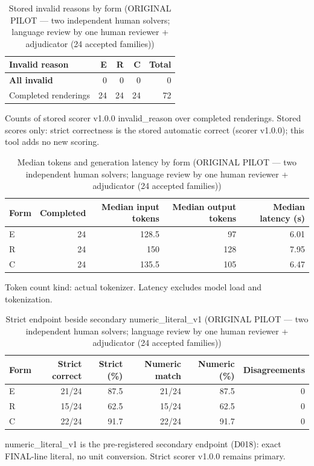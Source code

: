 \begin{table}[t]
\centering
\small
\caption{Stored invalid reasons by form (ORIGINAL PILOT --- two independent human solvers; language review by one human reviewer + adjudicator (24 accepted families))}
\label{tab:pilotorig-Llama-3.2-3B-Instruct-invalid}
\begin{tabular}{lrrrr}
\toprule
Invalid reason & E & R & C & Total \\
\midrule
\textbf{All invalid} & 0 & 0 & 0 & 0 \\
Completed renderings & 24 & 24 & 24 & 72 \\
\bottomrule
\end{tabular}
\par\smallskip
\parbox{\linewidth}{\footnotesize Counts of stored scorer v1.0.0 invalid\_reason over completed renderings. Stored scores only: strict correctness is the stored automatic correct (scorer v1.0.0); this tool adds no new scoring.}
\end{table}

\begin{table}[t]
\centering
\small
\caption{Median tokens and generation latency by form (ORIGINAL PILOT --- two independent human solvers; language review by one human reviewer + adjudicator (24 accepted families))}
\label{tab:pilotorig-Llama-3.2-3B-Instruct-resources}
\begin{tabular}{lrrrr}
\toprule
Form & Completed & Median input tokens & Median output tokens & Median latency (s) \\
\midrule
E & 24 & 128.5 & 97 & 6.01 \\
R & 24 & 150 & 128 & 7.95 \\
C & 24 & 135.5 & 105 & 6.47 \\
\bottomrule
\end{tabular}
\par\smallskip
\parbox{\linewidth}{\footnotesize Token count kind: actual tokenizer. Latency excludes model load and tokenization.}
\end{table}

\begin{table}[t]
\centering
\small
\caption{Strict endpoint beside secondary numeric\_literal\_v1 (ORIGINAL PILOT --- two independent human solvers; language review by one human reviewer + adjudicator (24 accepted families))}
\label{tab:pilotorig-Llama-3.2-3B-Instruct-numeric}
\begin{tabular}{lrrrrr}
\toprule
Form & Strict correct & Strict (\%) & Numeric match & Numeric (\%) & Disagreements \\
\midrule
E & 21/24 & 87.5 & 21/24 & 87.5 & 0 \\
R & 15/24 & 62.5 & 15/24 & 62.5 & 0 \\
C & 22/24 & 91.7 & 22/24 & 91.7 & 0 \\
\bottomrule
\end{tabular}
\par\smallskip
\parbox{\linewidth}{\footnotesize numeric\_literal\_v1 is the pre-registered secondary endpoint (D018): exact FINAL-line literal, no unit conversion. Strict scorer v1.0.0 remains primary.}
\end{table}

